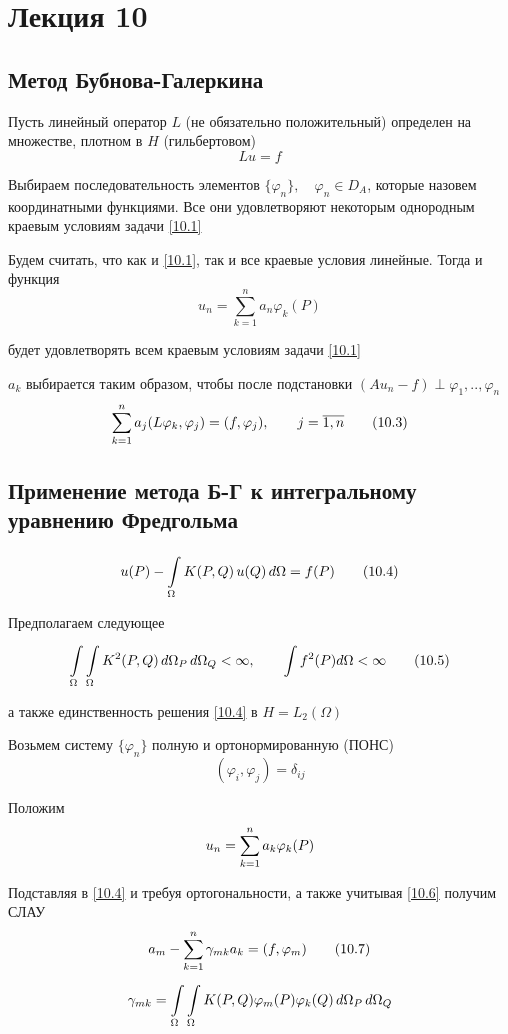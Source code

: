 \section{Лекция 10}

\subsection{Метод Бубнова-Галеркина}

Пусть линейный оператор $L$ (не обязательно положительный) определен на множестве, плотном в $H$ (гильбертовом)
\[ Lu = f \label{10.1} \tag{10.1} \]

Выбираем последовательность элементов $\{\varphi_n\}, \quad \varphi_n \in D_A $, которые назовем координатными функциями. Все они удовлетворяют некоторым однородным краевым условиям задачи \eqref{10.1}

Будем считать, что как и \eqref{10.1}, так и все краевые условия линейные. Тогда и функция
\[ u_n = \sum_{k=1}^{n}a_n \varphi_k(P) \label{10.2} \tag{10.2} \]

будет удовлетворять всем краевым условиям задачи \eqref{10.1}

$a_k$ выбирается таким образом, чтобы после подстановки $(A u_n - f) \perp \varphi_1, .., \varphi_n $
\[ \sum\limits_{k=1}^{n} a_j (L\varphi_k, \varphi_j)  = (f, \varphi_j), \qquad j= \overline{1, n} \label{10.3} \tag{10.3} \]

\subsection{Применение метода Б-Г к интегральному уравнению Фредгольма}

\[ u(P) - \int\limits_{\Omega}^{} K(P, Q) \, u(Q) \, d\Omega = f(P) \label{10.4} \tag{10.4} \]

Предполагаем следующее
\[ \int\limits_{\Omega}^{}\int\limits_{\Omega}^{} K^2 (P, Q) \, d\Omega_P \, d\Omega_Q < \infty, \qquad \int\limits_{}^{}f^2(P) d\Omega < \infty \label{10.5} \tag{10.5} \] 

а также единственность решения \eqref{10.4} в $H=L_2(\Omega)$

Возьмем систему $\{ \varphi_n \}$ полную и ортонормированную (ПОНС)
\[ (\varphi_i, \varphi_j) = \delta_{ij} \label{10.6} \tag{10.6} \]

Положим
\[ u_n = \sum\limits_{k=1}^{n}a_k \varphi_k (P) \]

Подставляя в \eqref{10.4} и требуя ортогональности, а также учитывая \eqref{10.6} получим СЛАУ
\[ a_m - \sum\limits_{k=1}^{n} \gamma_{mk} a_k =  (f, \varphi_m) \label{10.7} \tag{10.7} \]
\[ \gamma_{mk} = \int\limits_{\Omega}^{}\int\limits_{\Omega}^{} K(P, Q) \varphi_m (P) \varphi_k (Q) \, d\Omega_P \, d\Omega_Q \]

